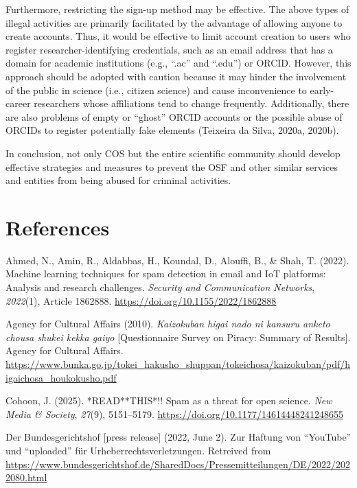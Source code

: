 \documentclass[authordate, meta]{jote-new-article}
\begin{document}
	Furthermore, restricting the sign-up method may be effective. The above types of illegal activities are primarily facilitated by the advantage of allowing anyone to create accounts. Thus, it would be effective to limit account creation to users who register researcher-identifying credentials, such as an email address that has a domain for academic institutions (e.g., “.ac” and “.edu”) or ORCID. However, this approach should be adopted with caution because it may hinder the involvement of the public in science (i.e., citizen science) and cause inconvenience to early-career researchers whose affiliations tend to change frequently. Additionally, there are also problems of empty or “ghost” ORCID accounts or the possible abuse of ORCIDs to register potentially fake elements (Teixeira da Silva, 2020a, 2020b).



	In conclusion, not only COS but the entire scientific community should develop effective strategies and measures to prevent the OSF and other similar services and entities from being abused for criminal activities.







	\section{References}



	Ahmed, N., Amin, R., Aldabbas, H., Koundal, D., Alouffi, B., \& Shah, T. (2022). Machine learning techniques for spam detection in email and IoT platforms: Analysis and research challenges. \emph{Security and Communication Networks}, \emph{2022}(1), Article 1862888. \url{https://doi.org/10.1155/2022/1862888}



	Agency for Cultural Affairs (2010). \emph{Kaizokuban higai nado ni kansuru anketo chousa shukei kekka gaiyo} [Questionnaire Survey on Piracy: Summary of Results]. Agency for Cultural Affairs. \url{https://www.bunka.go.jp/tokei\_hakusho\_shuppan/tokeichosa/kaizokuban/pdf/higaichosa\_houkokusho.pdf}



	Cohoon, J. (2025). *READ**THIS*!! Spam as a threat for open science. \emph{New Media \& Society}, \emph{27}(9), 5151--5179. \url{https://doi.org/10.1177/14614448241248655}



	Der Bundesgerichtshof [press release] (2022, June 2). Zur Haftung von “YouTube” und “uploaded” für Urheberrechtsverletzungen. Retreived from \url{https://www.bundesgerichtshof.de/SharedDocs/Pressemitteilungen/DE/2022/2022080.html}
\end{document}
